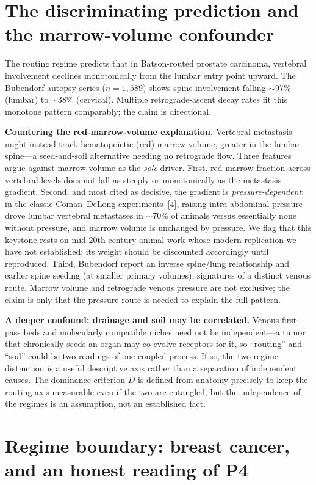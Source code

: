 \documentclass[11pt]{article}
\begin{document}
\section{The discriminating prediction and the marrow-volume confounder}

The routing regime predicts that in Batson-routed prostate carcinoma, vertebral
involvement declines monotonically from the lumbar entry point upward. The
Bubendorf autopsy series ($n=1{,}589$) shows spine involvement falling
$\sim$97\% (lumbar) to $\sim$38\% (cervical). Multiple retrograde-ascent decay
rates fit this monotone pattern comparably; the claim is directional.

\textbf{Countering the red-marrow-volume explanation.} Vertebral metastasis might
instead track hematopoietic (red) marrow volume, greater in the lumbar spine---a
seed-and-soil alternative needing no retrograde flow. Three features argue against
marrow volume as the \emph{sole} driver. First, red-marrow fraction across
vertebral levels does not fall as steeply or monotonically as the metastasis
gradient. Second, and most cited as decisive, the gradient is
\emph{pressure-dependent}: in the classic Coman--DeLong experiments~[4], raising
intra-abdominal pressure drove lumbar vertebral metastases in $\sim$70\% of
animals versus essentially none without pressure, and marrow volume is unchanged
by pressure. We flag that this keystone rests on mid-20th-century animal work
whose modern replication we have not established; its weight should be discounted
accordingly until reproduced. Third, Bubendorf report an inverse spine/lung
relationship and earlier spine seeding (at smaller primary volumes), signatures of
a distinct venous route. Marrow volume and retrograde venous pressure are not
exclusive; the claim is only that the pressure route is needed to explain the full
pattern.

\textbf{A deeper confound: drainage and soil may be correlated.} Venous
first-pass beds and molecularly compatible niches need not be independent---a
tumor that chronically seeds an organ may co-evolve receptors for it, so
``routing'' and ``soil'' could be two readings of one coupled process. If so, the
two-regime distinction is a useful descriptive axis rather than a separation of
independent causes. The dominance criterion $D$ is defined from anatomy precisely
to keep the routing axis measurable even if the two are entangled, but the
independence of the regimes is an assumption, not an established fact.

\section{Regime boundary: breast cancer, and an honest reading of P4}
\end{document}
